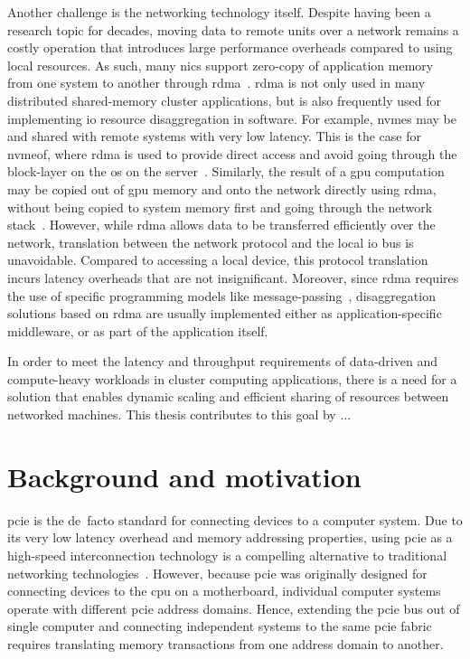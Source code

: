 Another challenge is the networking technology itself. 
Despite having been a research topic for decades, moving data to remote units over a network remains a costly operation that introduces large performance overheads compared to using local resources.
%
As such, many \glspl{nic} support zero-copy of application memory from one system to another through \gls{rdma}~\cite{Huang2012}.
%
\Gls{rdma} is not only used in many distributed shared-memory cluster applications, but is also frequently used for implementing \gls{io} resource \gls{disaggregation} in software.
%
For example, \glspl{nvme} may be  and shared with remote systems with very low latency.
This is the case for \gls{nvmeof}, where \gls{rdma} is used to provide direct access and avoid going through the block-layer on the \gls{os} on the server~\cite{Guz2018}.
%
Similarly, the result of a \gls{gpu} computation may be copied out of \gls{gpu} memory and onto the network directly using \gls{rdma}, without being copied to system memory first and going through the network stack~\cite{Venkatesh2014}.
%
However, while \gls{rdma} allows data to be transferred efficiently over the network, translation between the network protocol and the local \gls{io} bus is unavoidable. 
Compared to accessing a local device, this protocol translation incurs latency overheads that are not insignificant.
%
Moreover, since \gls{rdma} requires the use of specific programming models like message-passing~\cite{Jiang2004}, \gls{disaggregation} solutions based on \gls{rdma} are usually implemented either as application-specific \gls{middleware}, or as part of the application itself.



In order to meet the latency and throughput requirements of data-driven and compute-heavy workloads in cluster computing applications,
there is a need for a solution that enables dynamic scaling and efficient sharing of resources between networked machines. 
%
This thesis contributes to this goal by ...



\section{Background and motivation}\label{sec:motivation}
\Gls{pcie} is the de~facto standard for connecting devices to a computer system.
%
Due to its very low latency overhead and memory addressing properties, using \gls{pcie} as a high-speed interconnection technology is a compelling alternative to traditional networking technologies~\cite{url:Meduri2011,Lim2019}.
%
However, because \gls{pcie} was originally designed for connecting devices to the \gls{cpu} on a motherboard, individual computer systems operate with different \gls{pcie} address domains.
%
Hence, extending the \gls{pcie} bus out of single computer and connecting independent systems to the same \gls{pcie} fabric requires translating memory transactions from one address domain to another.




